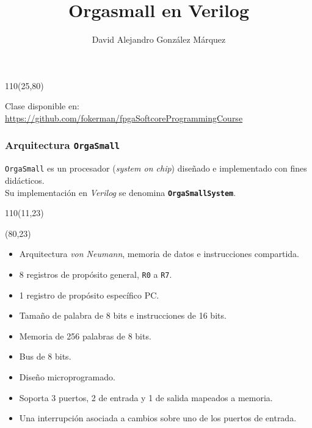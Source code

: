 \documentclass[aspectratio=169]{beamer}
\title{\Huge Orgasmall en Verilog}
\author{David Alejandro González Márquez}
\date{}
\begin{document}
\begin{frame}[plain]
    \titlepage
    \begin{textblock}{110}(25,80)
    \begin{tcolorbox}[size=small,width=\textwidth,colback={gray!30},title={}]
    \begin{center}
     \scriptsize Clase disponible en: \url{https://github.com/fokerman/fpgaSoftcoreProgrammingCourse}
    \end{center}
    \end{tcolorbox}
    \end{textblock}
\end{frame}

\begin{frame}[fragile,t]
    \frametitle{Arquitectura \texttt{OrgaSmall}}
    \texttt{OrgaSmall} es un procesador (\emph{system on chip}) diseñado e implementado con fines didácticos.\\
    \textcolor{verdeuca}{Su implementación en \emph{Verilog} se denomina \textbf{\texttt{OrgaSmallSystem}}.}\\
    \begin{textblock}{110}(11,23)
    \end{textblock}
    \begin{textblock}{70}(80,23)
    \begin{itemize}
    \setlength\itemsep{0em}
    \item<2-> Arquitectura \emph{von Neumann}, memoria de datos e instrucciones compartida.
    \item<3-> 8 registros de propósito general, \texttt{R0} a \texttt{R7}.
    \item<3-> 1 registro de propósito específico PC.
    \item<4-> Tamaño de palabra de 8 bits e instrucciones de 16 bits.
    \item<4-> Memoria de 256 palabras de 8 bits.
    \item<5-> Bus de 8 bits.
    \item<5-> Diseño microprogramado.
    \item<6-> Soporta 3 puertos, 2 de entrada y 1 de salida mapeados a memoria.
    \item<6-> Una interrupción asociada a cambios sobre uno de los puertos de entrada.
    \end{itemize}
    \end{textblock}
\end{frame}
\end{document}

